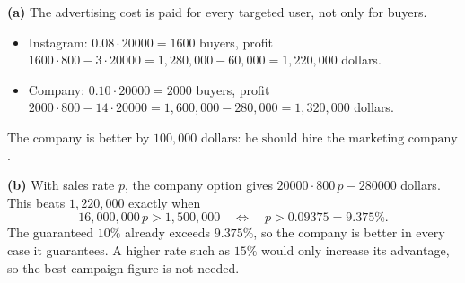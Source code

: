 \textbf{(a)} The advertising cost is paid for every targeted user, not only for buyers.
\begin{itemize}
\item Instagram: $0.08\cdot20000=1600$ buyers, profit $1600\cdot800-3\cdot20000=1{,}280{,}000-60{,}000=1{,}220{,}000$ dollars.
\item Company: $0.10\cdot20000=2000$ buyers, profit $2000\cdot800-14\cdot20000=1{,}600{,}000-280{,}000=1{,}320{,}000$ dollars.
\end{itemize}
The company is better by $100{,}000$ dollars: $\boxed{\text{he should hire the marketing company}}$.

\textbf{(b)} With sales rate $p$, the company option gives $20000\cdot800\,p-280000$ dollars. This beats $1{,}220{,}000$ exactly when
\[16{,}000{,}000\,p>1{,}500{,}000\quad\Longleftrightarrow\quad p>0.09375=9.375\%.\]
The guaranteed $10\%$ already exceeds $9.375\%$, so the company is better in every case it guarantees. A higher rate such as $15\%$ would only increase its advantage, so the best-campaign figure is not needed.
